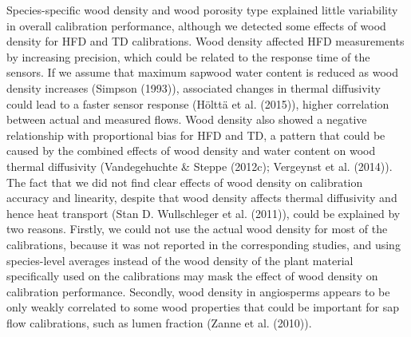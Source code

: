 \documentclass[11pt,twoside]{reedthesis}
\begin{document}
Species-specific wood density and wood porosity type explained little
variability in overall calibration performance, although we detected
some effects of wood density for HFD and TD calibrations. Wood density
affected HFD measurements by increasing precision, which could be
related to the response time of the sensors. If we assume that maximum
sapwood water content is reduced as wood density increases (Simpson
(1993)), associated changes in thermal diffusivity could lead to a
faster sensor response (Hölttä et al. (2015)), higher correlation
between actual and measured flows. Wood density also showed a negative
relationship with proportional bias for HFD and TD, a pattern that could
be caused by the combined effects of wood density and water content on
wood thermal diffusivity (Vandegehuchte \& Steppe (2012c); Vergeynst et
al. (2014)). The fact that we did not find clear effects of wood density
on calibration accuracy and linearity, despite that wood density affects
thermal diffusivity and hence heat transport (Stan D. Wullschleger et
al. (2011)), could be explained by two reasons. Firstly, we could not
use the actual wood density for most of the calibrations, because it was
not reported in the corresponding studies, and using species-level
averages instead of the wood density of the plant material specifically
used on the calibrations may mask the effect of wood density on
calibration performance. Secondly, wood density in angiosperms appears
to be only weakly correlated to some wood properties that could be
important for sap flow calibrations, such as lumen fraction (Zanne et
al. (2010)).\par
\end{document}
